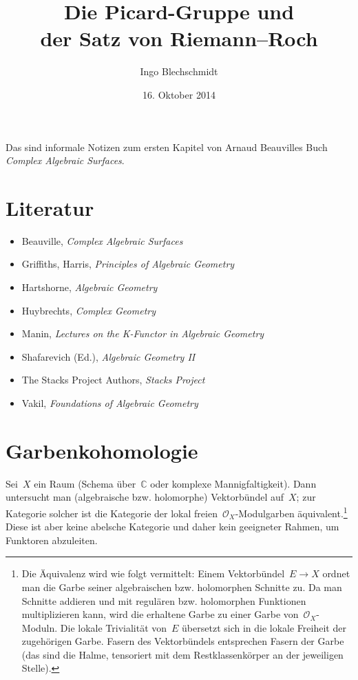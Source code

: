 \documentclass[a4paper,ngerman,12pt]{scrartcl}
\theoremstyle{definition}
\theoremstyle{plain}
\theoremstyle{remark}
\newcommand{\CC}{\mathbb{C}}
\renewcommand{\O}{\mathcal{O}}
\begin{document}
\title{Die Picard-Gruppe und \\ der Satz von Riemann--Roch}
\author{Ingo Blechschmidt}
\date{16. Oktober 2014}
\maketitle

\begin{center}\begin{minipage}{0.8\textwidth}
Das sind informale Notizen zum ersten Kapitel von Arnaud Beauvilles Buch
\emph{Complex Algebraic Surfaces}.
\end{minipage}\end{center}

\vspace{-3em}
\renewcommand\contentsname{}
\tableofcontents


\section*{Literatur}

\begin{itemize}
\item Beauville, \emph{Complex Algebraic Surfaces}
\item Griffiths, Harris, \emph{Principles of Algebraic Geometry}
\item Hartshorne, \emph{Algebraic Geometry}
\item Huybrechts, \emph{Complex Geometry}
\item Manin, \emph{Lectures on the K-Functor in Algebraic Geometry}
\item Shafarevich (Ed.), \emph{Algebraic Geometry II}
\item The Stacks Project Authors, \emph{Stacks Project}
\item Vakil, \emph{Foundations of Algebraic Geometry}
\end{itemize}


\section{Garbenkohomologie}

Sei~$X$ ein Raum (Schema über~$\CC$ oder komplexe Mannigfaltigkeit). Dann
untersucht man (algebraische bzw. holomorphe) Vektorbündel auf~$X$; zur
Kategorie solcher ist die Kategorie der lokal freien~$\O_X$-Modulgarben äquivalent.\footnote{Die
Äquivalenz wird wie folgt vermittelt: Einem Vektorbündel~$E \to X$ ordnet man
die Garbe seiner algebraischen bzw. holomorphen Schnitte zu. Da man Schnitte
addieren und mit regulären bzw. holomorphen Funktionen multiplizieren kann,
wird die erhaltene Garbe zu einer Garbe von~$\O_X$-Moduln. Die lokale
Trivialität von~$E$ übersetzt sich in die lokale Freiheit der zugehörigen
Garbe. Fasern des Vektorbündels entsprechen Fasern der Garbe (das sind die
Halme, tensoriert mit dem Restklassenkörper an der jeweiligen Stelle).}
Diese ist aber keine abelsche Kategorie und daher kein geeigneter Rahmen, um
Funktoren abzuleiten.
\end{document}

